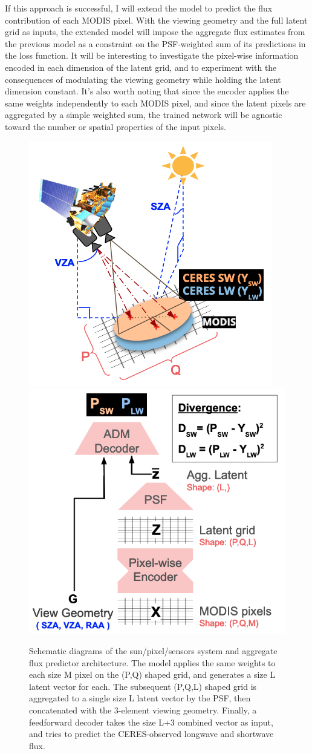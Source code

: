 \documentclass[11pt]{article}
\begin{document}
If this approach is successful, I will extend the model to predict the flux contribution of each MODIS pixel. With the viewing geometry and the full latent grid as inputs, the extended model will impose the aggregate flux estimates from the previous model as a constraint on the PSF-weighted sum of its predictions in the loss function. It will be interesting to investigate the pixel-wise information encoded in each dimension of the latent grid, and to experiment with the consequences of modulating the viewing geometry while holding the latent dimension constant. It's also worth noting that since the encoder applies the same weights independently to each MODIS pixel, and since the latent pixels are aggregated by a simple weighted sum, the trained network will be agnostic toward the number or spatial properties of the input pixels.

\begin{figure}[h!]
    \centering

    \includegraphics[width=.38\linewidth]{figs/sat_schematic.png}
    \includegraphics[width=.38\linewidth]{figs/model_arch.png}

    \caption{Schematic diagrams of the sun/pixel/sensors system and aggregate flux predictor architecture. The model applies the same weights to each size M pixel on the (P,Q) shaped grid, and generates a size L latent vector for each. The subsequent (P,Q,L) shaped grid is aggregated to a single size L latent vector by the PSF, then concatenated with the 3-element viewing geometry. Finally, a feedforward decoder takes the size L+3 combined vector as input, and tries to predict the CERES-observed longwave and shortwave flux.}
    \label{schematic}
\end{figure}
\end{document}
